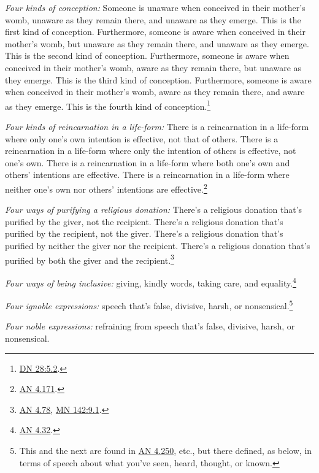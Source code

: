 \documentclass[12pt,openany]{book}%
\begin{document}
\emph{Four kinds of conception:} Someone is unaware when conceived in their mother’s womb, unaware as they remain there, and unaware as they emerge. This is the first kind of conception. Furthermore, someone is aware when conceived in their mother’s womb, but unaware as they remain there, and unaware as they emerge. This is the second kind of conception. Furthermore, someone is aware when conceived in their mother’s womb, aware as they remain there, but unaware as they emerge. This is the third kind of conception. Furthermore, someone is aware when conceived in their mother’s womb, aware as they remain there, and aware as they emerge. This is the fourth kind of conception.\footnote{\href{https://suttacentral.net/dn28/en/sujato\#5.2}{DN 28:5.2}. } 

\emph{Four kinds of reincarnation in a life-form:} There is a reincarnation in a life-form where only one’s own intention is effective, not that of others. There is a reincarnation in a life-form where only the intention of others is effective, not one’s own. There is a reincarnation in a life-form where both one’s own and others’ intentions are effective. There is a reincarnation in a life-form where neither one’s own nor others’ intentions are effective.\footnote{\href{https://suttacentral.net/an4.171/en/sujato}{AN 4.171}. } 

\emph{Four ways of purifying a religious donation:} There’s a religious donation that’s purified by the giver, not the recipient. There’s a religious donation that’s purified by the recipient, not the giver. There’s a religious donation that’s purified by neither the giver nor the recipient. There’s a religious donation that’s purified by both the giver and the recipient.\footnote{\href{https://suttacentral.net/an4.78/en/sujato}{AN 4.78}, \href{https://suttacentral.net/mn142/en/sujato\#9.1}{MN 142:9.1}. } 

\emph{Four ways of being inclusive:} giving, kindly words, taking care, and equality.\footnote{\href{https://suttacentral.net/an4.32/en/sujato}{AN 4.32}. } 

\emph{Four ignoble expressions:} speech that’s false, divisive, harsh, or nonsensical.\footnote{This and the next are found in \href{https://suttacentral.net/an4.250/en/sujato}{AN 4.250}, etc., but there defined, as below, in terms of speech about what you’ve seen, heard, thought, or known. } 

\emph{Four noble expressions:} refraining from speech that’s false, divisive, harsh, or nonsensical. 
\end{document}
